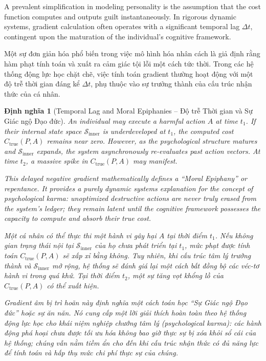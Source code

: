 \documentclass{report}
\newtheorem{dinhnghia}{Định nghĩa}
\begin{document}
A prevalent simplification in modeling personality is the assumption that the cost function computes and outputs guilt instantaneously. In rigorous dynamic systems, gradient calculation often operates with a significant temporal lag $\Delta t$, contingent upon the maturation of the individual's cognitive framework.

Một sự đơn giản hóa phổ biến trong việc mô hình hóa nhân cách là giả định rằng hàm phạt tính toán và xuất ra cảm giác tội lỗi một cách tức thời. Trong các hệ thống động lực học chặt chẽ, việc tính toán gradient thường hoạt động với một độ trễ thời gian đáng kể $\Delta t$, phụ thuộc vào sự trưởng thành của cấu trúc nhận thức của cá nhân.

\begin{dinhnghia}[Temporal Lag and Moral Epiphanies -- Độ trễ Thời gian và Sự Giác ngộ Đạo đức]
	An individual may execute a harmful action $A$ at time $t_1$. If their internal state space $\mathcal{S}_{\text{inner}}$ is underdeveloped at $t_1$, the computed cost $C_{\text{true}}(P,A)$ remains near zero. However, as the psychological structure matures and $\mathcal{S}_{\text{inner}}$ expands, the system asynchronously re-evaluates past action vectors. At time $t_2$, a massive spike in $C_{\text{true}}(P,A)$ may manifest. 
	
	This delayed negative gradient mathematically defines a ``Moral Epiphany'' or repentance. It provides a purely dynamic systems explanation for the concept of psychological karma: unoptimized destructive actions are never truly erased from the system's ledger; they remain latent until the cognitive framework possesses the capacity to compute and absorb their true cost.
	
	Một cá nhân có thể thực thi một hành vi gây hại $A$ tại thời điểm $t_1$. Nếu không gian trạng thái nội tại $\mathcal{S}_{\text{inner}}$ của họ chưa phát triển tại $t_1$, mức phạt được tính toán $C_{\text{true}}(P,A)$ sẽ xấp xỉ bằng không. Tuy nhiên, khi cấu trúc tâm lý trưởng thành và $\mathcal{S}_{\text{inner}}$ mở rộng, hệ thống sẽ đánh giá lại một cách bất đồng bộ các véc-tơ hành vi trong quá khứ. Tại thời điểm $t_2$, một sự tăng vọt khổng lồ của $C_{\text{true}}(P,A)$ có thể xuất hiện.
	
	Gradient âm bị trì hoãn này định nghĩa một cách toán học ``Sự Giác ngộ Đạo đức'' hoặc sự ăn năn. Nó cung cấp một lời giải thích hoàn toàn theo hệ thống động lực học cho khái niệm nghiệp chướng tâm lý (psychological karma): các hành động phá hoại chưa được tối ưu hóa không bao giờ thực sự bị xóa khỏi sổ cái của hệ thống; chúng vẫn nằm tiềm ẩn cho đến khi cấu trúc nhận thức có đủ năng lực để tính toán và hấp thụ mức chi phí thực sự của chúng.
\end{dinhnghia}
\end{document}
